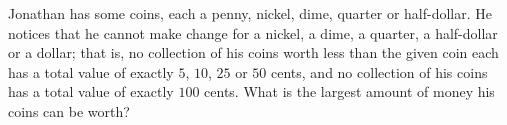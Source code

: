 Jonathan has some coins, each a penny, nickel, dime, quarter or half-dollar. He notices that he cannot make change for a nickel, a dime, a quarter, a half-dollar or a dollar; that is, no collection of his coins worth less than the given coin each has a total value of exactly $5$, $10$, $25$ or $50$ cents, and no collection of his coins has a total value of exactly $100$ cents. What is the largest amount of money his coins can be worth?
